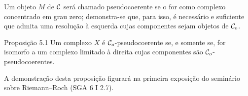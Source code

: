 Um objeto $M$ de $\mathcal C$ será chamado pseudocoerente se o for como complexo concentrado em grau zero; demonstra-se que, para isso, é necessário e suficiente que admita uma resolução à esquerda cujas componentes sejam objetos de $\mathcal C_o$.

\begin{statement}{Proposição 5.1}
Um complexo $X$ é $\mathcal C_o$-pseudocoerente se, e somente se, for isomorfo a um complexo limitado à direita cujas componentes são $\mathcal C_o$-pseudocoerentes.
\end{statement}

A demonstração desta proposição figurará na primeira exposição do seminário sobre Riemann--Roch (SGA 6 I 2.7).
